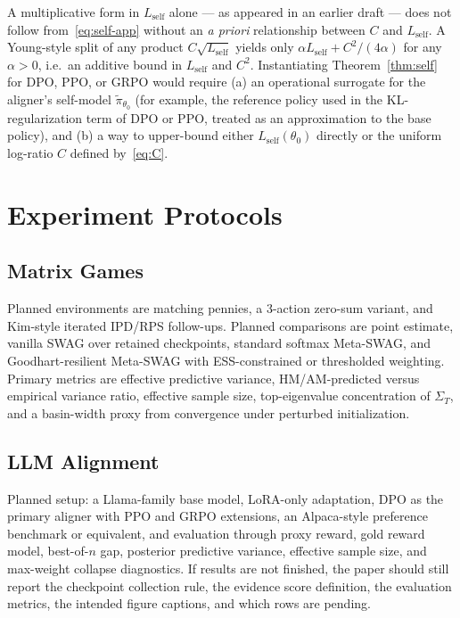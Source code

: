 \documentclass[10pt]{article}
\theoremstyle{plain}
\theoremstyle{definition}
\theoremstyle{remark}
\begin{document}
A multiplicative form in $L_{\mathrm{self}}$ alone --- as appeared in an earlier draft --- does not follow from~\eqref{eq:self-app} without an \emph{a priori} relationship between $C$ and $L_{\mathrm{self}}$. A Young-style split of any product $C\sqrt{L_{\mathrm{self}}}$ yields only $\alpha L_{\mathrm{self}} + C^2/(4\alpha)$ for any $\alpha>0$, i.e.\ an additive bound in $L_{\mathrm{self}}$ and $C^2$. Instantiating Theorem~\ref{thm:self} for DPO, PPO, or GRPO would require (a) an operational surrogate for the aligner's self-model $\tilde\pi_{\theta_0}$ (for example, the reference policy used in the KL-regularization term of DPO or PPO, treated as an approximation to the base policy), and (b) a way to upper-bound either $L_{\mathrm{self}}(\theta_0)$ directly or the uniform log-ratio $C$ defined by~\eqref{eq:C}.

\section{Experiment Protocols}

\subsection{Matrix Games}

Planned environments are matching pennies, a 3-action zero-sum variant, and Kim-style iterated IPD/RPS follow-ups. Planned comparisons are point estimate, vanilla SWAG over retained checkpoints, standard softmax Meta-SWAG, and Goodhart-resilient Meta-SWAG with ESS-constrained or thresholded weighting. Primary metrics are effective predictive variance, HM/AM-predicted versus empirical variance ratio, effective sample size, top-eigenvalue concentration of $\Sigma_T$, and a basin-width proxy from convergence under perturbed initialization.

\subsection{LLM Alignment}

Planned setup: a Llama-family base model, LoRA-only adaptation, DPO as the primary aligner with PPO and GRPO extensions, an Alpaca-style preference benchmark or equivalent, and evaluation through proxy reward, gold reward model, best-of-$n$ gap, posterior predictive variance, effective sample size, and max-weight collapse diagnostics. If results are not finished, the paper should still report the checkpoint collection rule, the evidence score definition, the evaluation metrics, the intended figure captions, and which rows are pending.
\end{document}
